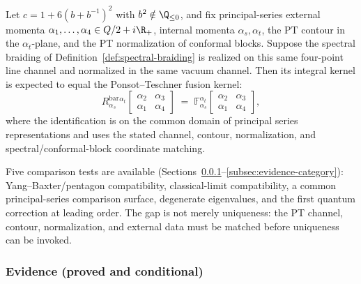 \begin{conjecture}[Virasoro spectral $R$-matrix $=$ Ponsot--Teschner
fusion kernel; \ClaimStatusConjectured]
\label{conj:R-equals-PT}
Let\/ $c = 1 + 6(b + b^{-1})^2$ with $b^2 \notin \Q_{\le 0}$, and
fix principal-series external momenta
$\alpha_1,\ldots,\alpha_4 \in Q/2+i\R_+$, internal momenta
$\alpha_s,\alpha_t$, the PT contour in the $\alpha_t$-plane, and the
PT normalization of conformal blocks. Suppose the spectral braiding of
Definition~\textup{\ref{def:spectral-braiding}} is realized on this
same four-point line channel and normalized in the same vacuum channel.
Then its integral kernel is expected to equal the Ponsot--Teschner
fusion kernel:
\[
R^{\mathrm{bar}}_{\alpha_s}{}^{\alpha_t}
\!\left[\begin{smallmatrix}
\alpha_2 & \alpha_3 \\
\alpha_1 & \alpha_4
\end{smallmatrix}\right]
\;=\;
\mathbb{F}_{\alpha_s}^{\alpha_t}
\!\left[\begin{smallmatrix}
 \alpha_2 & \alpha_3 \\
 \alpha_1 & \alpha_4
\end{smallmatrix}\right],
\]
where the identification is on the common domain of principal
series representations and uses the stated channel, contour,
normalization, and spectral/conformal-block coordinate matching.
\end{conjecture}

Five comparison tests are available
(Sections~\ref{subsec:evidence-YBE}--\ref{subsec:evidence-category}):
Yang--Baxter/pentagon compatibility, classical-limit compatibility, a
common principal-series comparison surface, degenerate eigenvalues, and
the first quantum correction at leading order. The gap is not merely
uniqueness: the PT channel, contour, normalization, and external data
must be matched before uniqueness can be invoked.

\subsubsection{Evidence (proved and conditional)}
\label{subsec:evidence-YBE}

